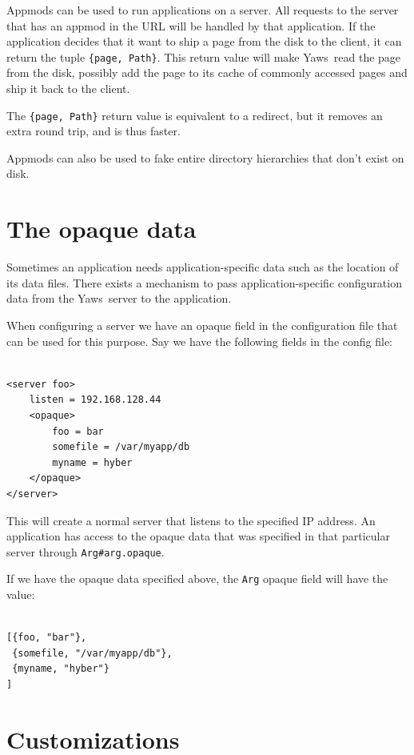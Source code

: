 \documentclass[11pt,oneside,english]{book}
\newcommand{\Yaws}            %
        {{\sc Yaws}}
\begin{document}
Appmods can be used to run applications on a server. All requests
to the server that has an appmod in the URL will be handled by that
application. If the application decides that it want to
ship a page from the disk to the client, it can return the
tuple \verb+{page, Path}+. This return value will make \Yaws\  read
the page from the disk, possibly add the page to its cache of
commonly accessed pages and ship it back to the client.

The \verb+{page, Path}+ return value is equivalent to a
redirect, but it removes an extra round trip, and is thus faster.

Appmods can also be used to fake entire directory hierarchies
that don't exist on disk.


\section{The opaque data}

Sometimes an application needs application-specific data such as the
location of its data files. There exists a mechanism to pass
application-specific configuration data from the \Yaws\ server to the
application.

When configuring a server we have an opaque field in the configuration
file that can be used for this purpose.  Say we have the following
fields in the config file:

\begin{verbatim}

<server foo>
    listen = 192.168.128.44
    <opaque>
        foo = bar
        somefile = /var/myapp/db
        myname = hyber
    </opaque>
</server>
\end{verbatim}

This will create a normal server that listens to the specified IP address.
An application has access to the opaque data that was specified
in that particular server through \verb+Arg#arg.opaque+.

If we have the opaque data specified above, the \verb+Arg+ opaque
field will have the value:

\begin{verbatim}

[{foo, "bar"},
 {somefile, "/var/myapp/db"},
 {myname, "hyber"}
]

\end{verbatim}


\section{Customizations}
\end{document}
